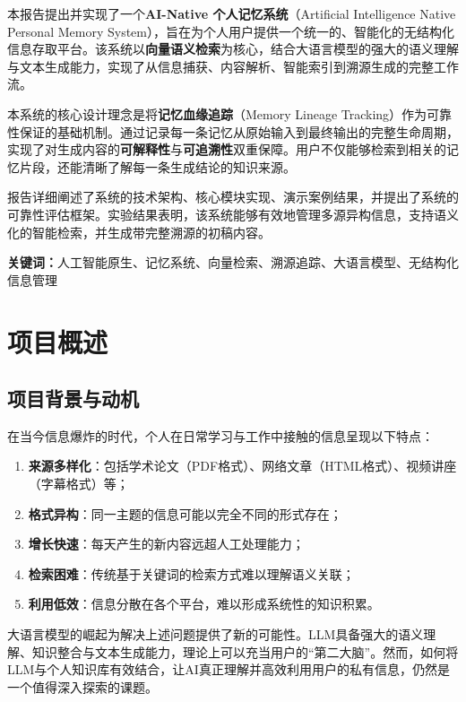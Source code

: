 \documentclass[12pt,a4paper,oneside]{article}
\begin{document}
本报告提出并实现了一个\textbf{AI-Native 个人记忆系统}（Artificial Intelligence Native Personal Memory System），旨在为个人用户提供一个统一的、智能化的无结构化信息存取平台。该系统以\textbf{向量语义检索}为核心，结合大语言模型的强大的语义理解与文本生成能力，实现了从信息捕获、内容解析、智能索引到溯源生成的完整工作流。

本系统的核心设计理念是将\textbf{记忆血缘追踪}（Memory Lineage Tracking）作为可靠性保证的基础机制。通过记录每一条记忆从原始输入到最终输出的完整生命周期，实现了对生成内容的\textbf{可解释性}与\textbf{可追溯性}双重保障。用户不仅能够检索到相关的记忆片段，还能清晰了解每一条生成结论的知识来源。

报告详细阐述了系统的技术架构、核心模块实现、演示案例结果，并提出了系统的可靠性评估框架。实验结果表明，该系统能够有效地管理多源异构信息，支持语义化的智能检索，并生成带完整溯源的初稿内容。

\vspace{1cm}
\noindent\textbf{关键词：}人工智能原生、记忆系统、向量检索、溯源追踪、大语言模型、无结构化信息管理

\newpage

\section{项目概述}

\subsection{项目背景与动机}

在当今信息爆炸的时代，个人在日常学习与工作中接触的信息呈现以下特点：

\begin{enumerate}[\arabic*)]
    \item \textbf{来源多样化}：包括学术论文（PDF格式）、网络文章（HTML格式）、视频讲座（字幕格式）等；
    \item \textbf{格式异构}：同一主题的信息可能以完全不同的形式存在；
    \item \textbf{增长快速}：每天产生的新内容远超人工处理能力；
    \item \textbf{检索困难}：传统基于关键词的检索方式难以理解语义关联；
    \item \textbf{利用低效}：信息分散在各个平台，难以形成系统性的知识积累。
\end{enumerate}

大语言模型的崛起为解决上述问题提供了新的可能性。LLM具备强大的语义理解、知识整合与文本生成能力，理论上可以充当用户的“第二大脑”。然而，如何将LLM与个人知识库有效结合，让AI真正理解并高效利用用户的私有信息，仍然是一个值得深入探索的课题。
\end{document}
